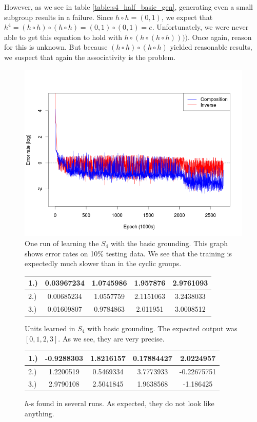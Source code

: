 However, as we see in table \ref{table:s4_half_basic_gen}, generating even a small subgroup results in a failure. Since $h\circ h=(0,1)$, we expect that $h^4=(h\circ h)\circ(h\circ h)=(0,1)\circ(0,1)=e$. Unfortunately, we were never able to get this equation to hold with $h\circ(h\circ(h\circ h))))$. Once again, reason for this is unknown. But because $(h\circ h)\circ (h\circ h)$ yielded reasonable results, we suspect that again the associativity is the problem.

\begin{figure}
\caption{One run of learning the $S_4$ with the basic grounding. This graph shows error rates on 10\% testing data. We see that the training is expectedly much slower than in the cyclic groups.}
\label{graph:s4_basic}
\includegraphics[width=0.9\linewidth]{../img/s4_comp+inv.png}
\end{figure}

\begin{figure}
\center
\caption{Units learned in $S_4$ with basic grounding. The expected output was $[0,1,2,3]$. As we see, they are very precise.}
\label{table:s4_unit_basic}
\begin{tabular}{l|cccc}
1.) &0.03967234 & 1.0745986 & 1.957876 & 2.9761093\\
\hline
2.) &0.00685234 & 1.0557759 & 2.1151063 & 3.2438033\\
\hline
3.) &0.01609807 & 0.9784863 & 2.011951 & 3.0008512\\
\end{tabular}
\end{figure}

\begin{figure}
\center
\caption{$h$-s found in several runs. As expected, they do not look like anything.}
\label{table:s4_half_basic}
\begin{tabular}{l|cccc}
1.)&-0.9288303 & 1.8216157 & 0.17884427 & 2.0224957\\
\hline
2.)&1.2200519 & 0.5469334 & 3.7773933 & -0.22675751\\
 \hline
3.)&2.9790108 & 2.5041845 & 1.9638568 & -1.186425\\
\end{tabular}
\end{figure}

